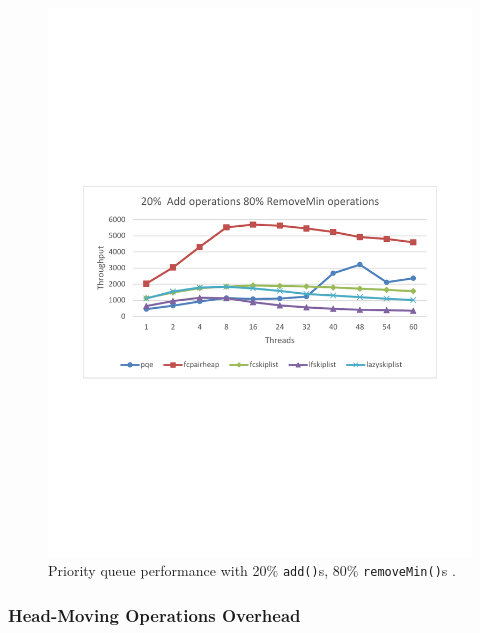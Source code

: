 \begin{figure}[htb]
\begin{minipage}[b]{.495\textwidth}
		\includegraphics[width=\linewidth]{graphics/sparc-20-80.pdf}
		\caption{Priority queue performance with 20\% \texttt{add()}s, 80\% \texttt{removeMin()}s \cite{calciu_adaptive_2014}.}
		\label{fig:sparc_20}
	\end{minipage}
\end{figure}

\subsubsection{Head-Moving Operations Overhead}

